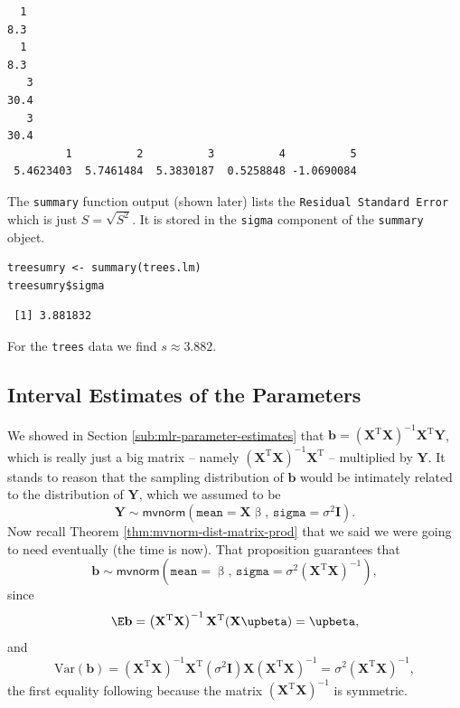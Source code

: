 \documentclass[captions=tableheading]{scrbook}
\begin{document}
\begin{verbatim}
  1 
8.3
  1 
8.3
   3 
30.4
   3 
30.4
         1          2          3          4          5 
 5.4623403  5.7461484  5.3830187  0.5258848 -1.0690084
\end{verbatim}

The \texttt{summary} function output (shown later) lists the \texttt{Residual Standard Error} which is just \(S=\sqrt{S^{2}}\). It is stored in the \texttt{sigma} component of the \texttt{summary} object.


\begin{verbatim}
treesumry <- summary(trees.lm)
treesumry$sigma
\end{verbatim}

\begin{verbatim}
 [1] 3.881832
\end{verbatim}

For the \texttt{trees} data we find \(s\approx  3.882 \).
\subsection{Interval Estimates of the Parameters}
\label{sec-12-2-4}

\label{sub:mlr-interval-est-params}

We showed in Section \ref{sub:mlr-parameter-estimates} that \(\mathbf{b}=\left(\mathbf{X}^{\mathrm{T}}\mathbf{X}\right)^{-1}\mathbf{X}^{\mathrm{T}}\mathbf{Y}\), which is really just a big matrix -- namely \(\left(\mathbf{X}^{\mathrm{T}}\mathbf{X}\right)^{-1}\mathbf{X}^{\mathrm{T}}\) -- multiplied by \(\mathbf{Y}\). It stands to reason that the sampling distribution of \(\mathbf{b}\) would be intimately related to the distribution of \(\mathbf{Y}\), which we assumed to be
\begin{equation}
\mathbf{Y}\sim\mathsf{mvnorm}\left(\mathtt{mean}=\mathbf{X}\upbeta,\,\mathtt{sigma}=\sigma^{2}\mathbf{I}\right).
\end{equation}
Now recall Theorem \ref{thm:mvnorm-dist-matrix-prod} that we said we were going to need eventually (the time is now). That proposition guarantees that
\begin{equation}
\mathbf{b}\sim\mathsf{mvnorm}\left(\mathtt{mean}=\upbeta,\,\mathtt{sigma}=\sigma^{2}\left(\mathbf{X}^{\mathrm{T}}\mathbf{X}\right)^{-1}\right),\label{eq:distn-b-mlr}
\end{equation}
since
\begin{equation}
\E\mathbf{b}=\left(\mathbf{X}^{\mathrm{T}}\mathbf{X}\right)^{-1}\mathbf{X}^{\mathrm{T}}(\mathbf{X}\upbeta)=\upbeta,
\end{equation}
and
\begin{equation}
\mbox{Var}(\mathbf{b})=\left(\mathbf{X}^{\mathrm{T}}\mathbf{X}\right)^{-1}\mathbf{X}^{\mathrm{T}}(\sigma^{2}\mathbf{I})\mathbf{X}\left(\mathbf{X}^{\mathrm{T}}\mathbf{X}\right)^{-1}=\sigma^{2}\left(\mathbf{X}^{\mathrm{T}}\mathbf{X}\right)^{-1},
\end{equation}
the first equality following because the matrix \(\left(\mathbf{X}^{\mathrm{T}}\mathbf{X}\right)^{-1}\) is symmetric.
\end{document}
